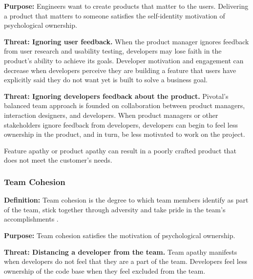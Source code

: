 \textbf{Purpose:} Engineers want to create products that matter to the users. Delivering a product that matters to someone satisfies the self-identity motivation of psychological ownership.

\textbf{Threat: Ignoring user feedback.} When the product manager ignores feedback from user research and usability testing, developers may lose faith in the product’s ability to achieve its goals. Developer motivation and engagement can decrease when developers perceive they are building a feature that users have explicitly said they do not want yet is built to solve a business goal. 

\textbf{Threat: Ignoring developers feedback about the product.} Pivotal’s balanced team approach is founded on collaboration between product managers, interaction designers, and developers. When product managers or other stakeholders ignore feedback from developers, developers can begin to feel less ownership in the product, and in turn, be less motivated to work on the project. 


Feature apathy or product apathy can result in a poorly crafted product that does not meet the customer’s needs.

\subsubsection{Team Cohesion}
\textbf{Definition:} Team cohesion is the degree to which team members identify as part of the team, stick together through adversity and take pride in the team’s accomplishments \cite{Bollen1990Perceived, Beal2003Cohesion, Whitworth2007Motivation}.

\textbf{Purpose:} Team cohesion satisfies the  motivation of psychological ownership.

\textbf{Threat: Distancing a developer from the team.} Team apathy manifests when developers do not feel that they are a part of the team. Developers feel less ownership of the code base when they feel excluded from the team.

